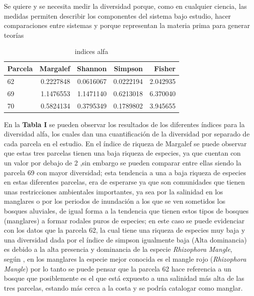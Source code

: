 \documentclass[conference,final,12pt,]{IEEEtran}
\begin{document}
Se quiere y se necesita medir la diversidad porque, como en cualquier
ciencia, las medidas permiten describir los componentes del sistema bajo
estudio, hacer comparaciones entre sistemas y porque representan la
materia prima para generar teorías \citep{U}

\begin{table}

\caption{\label{tab:unnamed-chunk-2}indices alfa}
\centering
\begin{tabular}[t]{l|r|r|r|r}
\hline
Parcela & Margalef & Shannon & Simpson & Fisher\\
\hline
62 & 0.2227848 & 0.0616067 & 0.0222194 & 2.042935\\
\hline
69 & 1.1476553 & 1.1471140 & 0.6213018 & 6.370040\\
\hline
70 & 0.5824134 & 0.3795349 & 0.1789802 & 3.945655\\
\hline
\end{tabular}
\end{table}

En la \textbf{Tabla I} se pueden observar los resultados de los
diferentes índices para la diversidad alfa, los cuales dan una
cuantificación de la diversidad por separado de cada parcela en el
estudio. En el índice de riqueza de Margalef se puede observar que estas
tres parcelas tienen una baja riqueza de especies, ya que cuentan con un
valor por debajo de 2 \citep{B},sin embargo se pueden comparar entre
ellas siendo la parcela 69 con mayor diversidad; esta tendencia a una a
baja riqueza de especies en estas diferentes parcelas, era de esperarse
ya que son comunidades que tienen unas restricciones ambientales
importantes, ya sea por la salinidad en los manglares\citep{AD} o por los
periodos de inundación a los que se ven sometidos los bosques aluviales,
de igual forma a la tendencia que tienen estos tipos de bosques
(manglares) a formar rodales puros de especies; en este caso se puede
evidenciar con los datos que la parcela 62, la cual tiene una riqueza de
especies muy baja y una diversidad dada por el índice de simpson
igualmente baja (Alta dominancia) es debido a la alta presencia y
dominancia de la especie \emph{Rhizophora Mangle}, según \citep{Z}, en
los manglares la especie mejor conocida es el mangle rojo
(\emph{Rhizophora Mangle}) por lo tanto se puede pensar que la parcela
62 hace referencia a un bosque que posiblemente es el que está expuesto
a una salinidad más alta de las tres parcelas, estando más cerca a la
costa y se podría catalogar como manglar.
\end{document}
